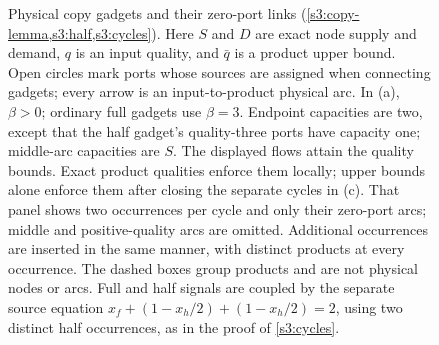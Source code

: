 \begin{figure}[p]
\caption{Physical copy gadgets and their zero-port links
(\cref{s3:copy-lemma,s3:half,s3:cycles}). Here $S$ and $D$ are exact
node supply and demand, $q$ is an input quality, and $\bar q$ is a
product upper bound. Open circles mark ports whose sources are assigned
when connecting gadgets; every arrow is an input-to-product physical arc.
In (a), $\beta>0$; ordinary full gadgets use $\beta=3$.
Endpoint capacities are two, except that the half gadget's quality-three
ports have capacity one; middle-arc capacities are $S$.
The displayed flows attain the quality bounds. Exact product qualities
enforce them locally; upper bounds alone enforce them after closing the
separate cycles in (c). That panel shows two occurrences per cycle and
only their zero-port arcs; middle and positive-quality arcs are omitted.
Additional occurrences are inserted in the same manner, with distinct
products at every occurrence. The dashed boxes group products and are not
physical nodes or arcs. Full and half signals are coupled by the
separate source equation $x_f+(1-x_h/2)+(1-x_h/2)=2$, using two distinct
half occurrences, as in the proof of \cref{s3:cycles}.}
\label{s3:copy-figure}
\end{figure}
